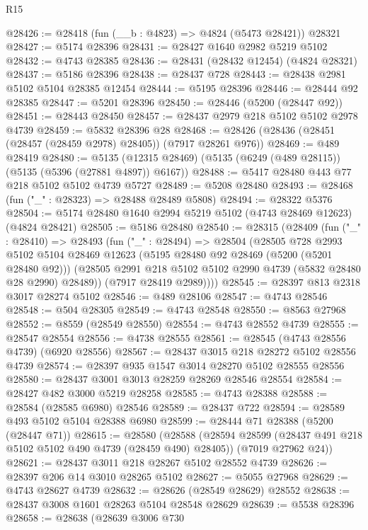 \begin{lexlean}{R15}
\begin{coremodule}
{{{{{{{{{{{@28426 := @28418 (fun (__b : @4823) => @4824 (@5473 @28421)) @28321
@28427 := @5174 @28396
@28431 := @28427 @1640 @2982 @5219 @5102
@28432 := @4743 @28385
@28436 := @28431 (@28432 @12454) (@4824 @28321)
@28437 := @5186 @28396
@28438 := @28437 @728
@28443 := @28438 @2981 @5102 @5104 @28385 @12454
@28444 := @5195 @28396
@28446 := @28444 @92 @28385
@28447 := @5201 @28396
@28450 := @28446 (@5200 (@28447 @92))
@28451 := @28443 @28450
@28457 := @28437 @2979 @218 @5102 @5102 @2978 @4739
@28459 := @5832 @28396 @28
@28468 := @28426 (@28436 (@28451 (@28457 (@28459 @2978) @28405)) (@7917 @28261 @976))
@28469 := @489 @28419
@28480 := @5135 (@12315 @28469) (@5135 (@6249 (@489 @28115)) (@5135 (@5396 (@27881 @4897)) @6167))
@28488 := @5417 @28480 @443 @77 @218 @5102 @5102 @4739 @5727
@28489 := @5208 @28480
@28493 := @28468 (fun ("_" : @28323) => @28488 @28489 @5808)
@28494 := @28322 @5376
@28504 := @5174 @28480 @1640 @2994 @5219 @5102 (@4743 @28469 @12623) (@4824 @28421)
@28505 := @5186 @28480
@28540 := @28315
    (@28409
      (fun ("_" : @28410) =>
      @28493
        (fun ("_" : @28494) =>
        @28504
          (@28505
            @728
            @2993
            @5102
            @5104
            @28469
            @12623
            (@5195 @28480 @92 @28469 (@5200 (@5201 @28480 @92)))
            (@28505 @2991 @218 @5102 @5102 @2990 @4739 (@5832 @28480 @28 @2990) @28489))
          (@7917 @28419 @2989))))
@28545 := @28397 @813 @2318 @3017 @28274 @5102
@28546 := @489 @28106
@28547 := @4743 @28546
@28548 := @504 @28305
@28549 := @4743 @28548
@28550 := @8563 @27968
@28552 := @8559 (@28549 @28550)
@28554 := @4743 @28552 @4739
@28555 := @28547 @28554
@28556 := @4738 @28555
@28561 := @28545 (@4743 @28556 @4739) (@6920 @28556)
@28567 := @28437 @3015 @218 @28272 @5102 @28556 @4739
@28574 := @28397 @935 @1547 @3014 @28270 @5102 @28555 @28556
@28580 := @28437 @3001 @3013 @28259 @28269 @28546 @28554
@28584 := @28427 @482 @3000 @5219 @28258
@28585 := @4743 @28388
@28588 := @28584 (@28585 @6980) @28546
@28589 := @28437 @722
@28594 := @28589 @493 @5102 @5104 @28388 @6980
@28599 := @28444 @71 @28388 (@5200 (@28447 @71))
@28615 := @28580
    (@28588
      (@28594 @28599 (@28437 @491 @218 @5102 @5102 @490 @4739 (@28459 @490) @28405))
      (@7019 @27962 @24))
@28621 := @28437 @3011 @218 @28267 @5102 @28552 @4739
@28626 := @28397 @206 @14 @3010 @28265 @5102
@28627 := @5055 @27968
@28629 := @4743 @28627 @4739
@28632 := @28626 (@28549 @28629) @28552
@28638 := @28437 @3008 @1601 @28263 @5104 @28548 @28629
@28639 := @5538 @28396
@28658 := @28638
    (@28639
      @3006
      @730
}}}}}}}}}}}
\end{coremodule}
\end{lexlean}
